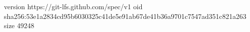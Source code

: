 version https://git-lfs.github.com/spec/v1
oid sha256:53e1a2834cd95b6030325c41de5e91ab67de41b36a9701c7547ad351c821a263
size 49248
